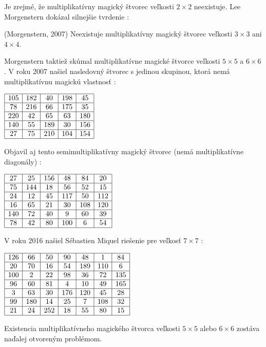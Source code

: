 Je zrejmé, že multiplikatívny magický štvorec veľkosti $2 \times 2$ neexistuje. Lee Morgenstern dokázal silnejšie tvrdenie \cite{multimagie}:

\begin{theorem} (Morgenstern, 2007) Neexistuje multiplikatívny magický štvorec veľkosti $3 \times 3$ ani $4 \times 4$.
\end{theorem}

Morgenstern taktiež skúmal multiplikatívne magické štvorce veľkosti $5 \times 5$ a $6 \times 6$. V roku 2007 našiel nasledovný štvorec s jedinou skupinou, ktorá nemá multiplikatívnu magickú vlastnosť \cite{multimagie}:

\begin{center}
$\begin{array}{ |c|c|c|c|c| }
\hline
105 & 182 & 40 & 198 & 45 \\ 
\hline
78 & 216 & 66 & 175 & 35  \\ 
\hline
220 & 42 & 65 & 63 & 180 \\ 
\hline
140 & 55 & 189 & 30 & 156 \\ 
\hline
27 & 75 & 210 & 104 & 154 \\ 
\hline
\end{array}$
\end{center}

Objavil aj tento semimultiplikatívny magický štvorec (nemá multiplikatívne diagonály) \cite{multimagie}:

\begin{center}
$\begin{array}{ |c|c|c|c|c|c| }
\hline
27 & 25 & 156 & 48 & 84 & 20 \\ 
\hline
75 & 144 & 18 & 56 & 52 & 15 \\ 
\hline
24 & 12 & 45 & 117 & 50 & 112 \\ 
\hline
16 & 65 & 21 & 30 & 108 & 120 \\ 
\hline
140 & 72 & 40 & 9 & 60 & 39 \\ 
\hline
78 & 42 & 80 & 100 & 6 & 54 \\
\hline
\end{array}$
\end{center}

V roku 2016 našiel Sébastien Miquel riešenie pre veľkosť $7 \times 7$  \cite{multimagie}:

\begin{center}
$\begin{array}{ |c|c|c|c|c|c|c| } 
\hline
126 & 66 & 50 & 90 & 48 & 1 & 84 \\ 
\hline
20 & 70 & 16 & 54 & 189 & 110 & 6 \\ 
\hline
100 & 2 & 22 & 98 & 36 & 72 & 135 \\
\hline
96 & 60 & 81 & 4 & 10 & 49 & 165 \\
\hline
3 & 63 & 30 & 176 & 120 & 45 & 28 \\
\hline
99 & 180 & 14 & 25 & 7 & 108 & 32 \\
\hline
21 & 24 & 252 & 18 & 55 & 80 & 15 \\
\hline
\end{array}$
\end{center}

Existencia multiplikatívneho magického štvorca veľkosti $5 \times 5$ alebo $6 \times 6$ zostáva naďalej otvoreným problémom.











